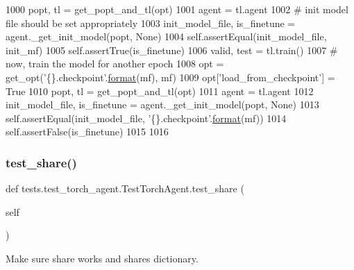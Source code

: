 \begin{DoxyCode}
1000                 popt, tl = get\_popt\_and\_tl(opt)
1001                 agent = tl.agent
1002                 \textcolor{comment}{# init model file should be set appropriately}
1003                 init\_model\_file, is\_finetune = agent.\_get\_init\_model(popt, \textcolor{keywordtype}{None})
1004                 self.assertEqual(init\_model\_file, init\_mf)
1005                 self.assertTrue(is\_finetune)
1006                 valid, test = tl.train()
1007                 \textcolor{comment}{# now, train the model for another epoch}
1008                 opt = get\_opt(\textcolor{stringliteral}{'\{\}.checkpoint'}.\hyperlink{namespaceparlai_1_1chat__service_1_1services_1_1messenger_1_1shared__utils_a32e2e2022b824fbaf80c747160b52a76}{format}(mf), mf)
1009                 opt[\textcolor{stringliteral}{'load\_from\_checkpoint'}] = \textcolor{keyword}{True}
1010                 popt, tl = get\_popt\_and\_tl(opt)
1011                 agent = tl.agent
1012                 init\_model\_file, is\_finetune = agent.\_get\_init\_model(popt, \textcolor{keywordtype}{None})
1013                 self.assertEqual(init\_model\_file, \textcolor{stringliteral}{'\{\}.checkpoint'}.\hyperlink{namespaceparlai_1_1chat__service_1_1services_1_1messenger_1_1shared__utils_a32e2e2022b824fbaf80c747160b52a76}{format}(mf))
1014                 self.assertFalse(is\_finetune)
1015 
1016 
\end{DoxyCode}
\mbox{\label{classtests_1_1test__torch__agent_1_1TestTorchAgent_af3d1c7681a30a06684117464ccefb15d}} 
\subsubsection{\texorpdfstring{test\+\_\+share()}{test\_share()}}
{\footnotesize\ttfamily def tests.\+test\+\_\+torch\+\_\+agent.\+Test\+Torch\+Agent.\+test\+\_\+share (\begin{DoxyParamCaption}\item[{}]{self }\end{DoxyParamCaption})}

\begin{DoxyVerb}Make sure share works and shares dictionary.
\end{DoxyVerb}
 

